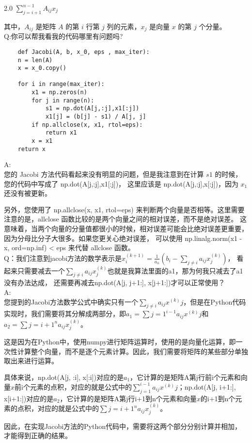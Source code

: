 \documentclass[12pt, a4paper, oneside]{article}
\begin{document}
\begin{spacing}{2.0}
$\sum_{j=i+1}^{n-1} A_{ij} x_j$

其中，$A_{ij}$ 是矩阵 $A$ 的第 $i$ 行第 $j$ 列的元素，$x_j$ 是向量 $x$ 的第 $j$ 个分量。\\
Q:你可以帮我看我的代码哪里有问题吗?\\
\begin{lstlisting}
    def Jacobi(A, b, x_0, eps , max_iter):
    n = len(A)
    x = x_0.copy()

    for i in range(max_iter):
        x1 = np.zeros(n)
        for j in range(n):
            s1 = np.dot(A[j,:j],x1[:j])
            x1[j] = (b[j] - s1) / A[j, j]
        if np.allclose(x, x1, rtol=eps):
            return x1
        x = x1
    return x
\end{lstlisting}
A:\\
您的 Jacobi 方法代码看起来没有明显的问题，但是我注意到在计算 $s1$ 的时候，您的代码中写成了 np.dot(A[j,:j],x1[:j])，
这里应该是 np.dot(A[j,:j],x[:j])，因为 $x_1$ 还没有被更新。

另外，您使用了 np.allclose(x, x1, rtol=eps) 来判断两个向量是否相等。这里需要注意的是，allclose 函数比较的是两个向量之间的相对误差，而不是绝对误差。
这意味着，当两个向量的分量值都很小的时候，相对误差可能会比绝对误差更重要，因为分母比分子大很多。如果您更关心绝对误差，
可以使用 np.linalg.norm(x1 - x, ord=np.inf) < eps 来代替 allclose 函数。\\
Q：我们注意到jacobi方法的数学表示是$x^{(k+1)}_i  = \frac{1}{a_{ii}} \left(b_i -\sum_{j\ne i}a_{ij}x^{(k)}_j\right)$，
看起来只需要减去一个$\sum_{j\ne i}a_{ij}x^{(k)}_j$也就是我算法里面的a1，那为何我只减去了a1没有办法达成，
还需要再减去np.dot(A[j, j+1:], x[j+1:])才可以正常使用？\\
A:\\
您提到的Jacobi方法数学公式中确实只有一个$\sum_{j\ne i}a_{ij}x^{(k)}j$，但是在Python代码实现时，我们需要将其分解成两部分，即$a_1 = \sum{j=1}^{i-1} a_{ij}x^{(k)}j$和$a_2 = \sum{j=i+1}^{n} a_{ij}x^{(k)}_j$。

这是因为在Python中，使用numpy进行矩阵运算时，使用的是向量化运算，即一次性计算整个向量，而不是逐个元素计算。因此，我们需要将矩阵的某些部分单独取出来进行运算。

具体来说，np.dot(A[j, :i], x[:i])对应的是$a_1$，它计算的是矩阵A第j行前i个元素和向量$x$前i个元素的点积，对应的就是公式中的$\sum_{j=1}^{i-1} a_{ij}x^{(k)}j$；np.dot(A[j, i+1:], x[i+1:])对应的是$a_2$，它计算的是矩阵A第j行i+1到n个元素和向量$x$的i+1到n个元素的点积，对应的就是公式中的$\sum{j=i+1}^{n} a_{ij}x^{(k)}_j$。

因此，在实现Jacobi方法的Python代码中，需要将这两个部分分别计算并相加，才能得到正确的结果。




\end{spacing}
\end{document}

